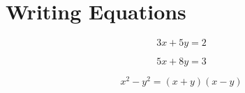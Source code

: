 \documentclass{article}
\begin{document}
	\section{Writing Equations}
	\paragraph{}
	\begin{equation}
		3x+5y=2
	\end{equation}

\begin{equation}
	5x+8y=3
\end{equation}

\begin{equation}
	x^{2}-y^{2}=(x+y)(x-y)
\end{equation}
\end{document}
